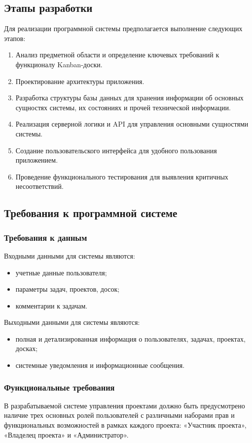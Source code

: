 \subsection{Этапы разработки}

Для реализации программной системы предполагается выполнение следующих этапов:
\begin{enumerate}
	\item Анализ предметной области и определение ключевых требований к функционалу Kanban-доски.
	\item Проектирование архитектуры приложения.
	\item Разработка структуры базы данных для хранения информации об основных сущностях системы, их состояниях и прочей технической информации.
	\item Реализация серверной логики и API для управления основными сущностями системы.
	\item Создание пользовательского интерфейса для удобного пользования приложением.
	\item Проведение функционального тестирования для выявления критичных несоответствий.
\end{enumerate}

\subsection{Требования к программной системе}

\subsubsection{Требования к данным}
Входными данными для системы являются:
\begin{itemize}
	\item учетные данные пользователя;
	\item параметры задач, проектов, досок;
	\item комментарии к задачам.
\end{itemize}
Выходными данными для системы являются:
\begin{itemize}
	\item полная и детализированная информация о пользователях, задачах, проектах, досках;
	\item системные уведомления и информационные сообщения.
\end{itemize}

\subsubsection{Функциональные требования}
В разрабатываемой системе управления проектами должно быть предусмотрено наличие трех основных ролей пользователей с различными наборами прав и функциональных возможностей в рамках каждого проекта: «Участник проекта», «Владелец проекта» и «Администратор».

